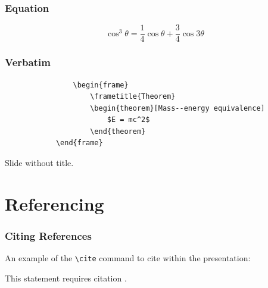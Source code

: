 \documentclass[
11pt, %
]{beamer}
\begin{document}
	
	\begin{frame}
		\frametitle{Equation}
		
		\begin{equation}
			\cos^3 \theta =\frac{1}{4}\cos\theta+\frac{3}{4}\cos 3\theta
		\end{equation}
	\end{frame}
	
	
	\begin{frame}[fragile] %
		\frametitle{Verbatim}
		
		\begin{example}
			\begin{verbatim}
				\begin{frame}
					\frametitle{Theorem}
					\begin{theorem}[Mass--energy equivalence]
						$E = mc^2$
					\end{theorem}
			\end{frame}\end{verbatim} %
		\end{example}
	\end{frame}
	
	
	\begin{frame}
		Slide without title.
	\end{frame}
	
	
	\section{Referencing}
	
	\begin{frame}
		\frametitle{Citing References}
		
		An example of the \texttt{\textbackslash cite} command to cite within the presentation:
		
		\bigskip %
		
		This statement requires citation \cite{p1,p2}.
	\end{frame}
	
	
\end{document}
